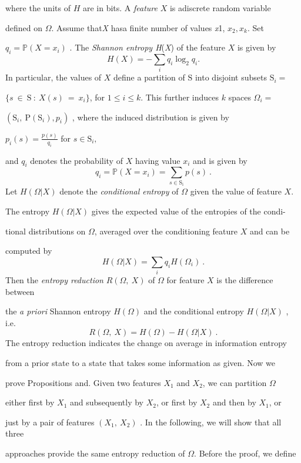 \documentclass[a4paper,12pt]{article}
\begin{document}
where the units of $H$ are in bits. A {\it feature} $X$ is adiscrete random variable

defined on $\Omega$. Assume that{\it X} hasa finite number of values {\it x}1, $x_{2}, x_{k}$. Set

$q_{i}=\mathbb{P}(X=x_{i})$ . The {\it Shannon entropy H}({\it X}) of the feature $X$ is given by
$$
H(X)=-\sum_{i}q_{i}\log_{2}q_{i}.
$$
In particular, the values of $X$ define a partition of $\mathrm{S}$ into disjoint subsets $\mathrm{S}_{i} =$

$\{s\ \in\ \mathrm{S}\ :\ X(s)\ =\ x_{i}\}$, for $1 \leq i \leq k$. This further induces $k$ spaces $\Omega_{i} =$

$(\mathrm{S}_{i},\ \mathrm{P}(\mathrm{S}_{i}),p_{i})$ , where the induced distribution is given by

$p_{i}(s)=\displaystyle \frac{p(s)}{q_{i}}$ for $s\in \mathrm{S}_{i},$

and $q_{i}$ denotes the probability of $X$ having value $x_{i}$ and is given by
$$
q_{i}=\mathbb{P}(X=x_{i})=\sum_{s\in \mathrm{S}_{\mathrm{i}}}p(s)\ .
$$
Let $H(\Omega|X)$ denote the {\it conditional entropy} of $\Omega$ given the value of feature $X.$

The entropy $H(\Omega|X)$ gives the expected value of the entropies of the condi-

tional distributions on $\Omega$, averaged over the conditioning feature $X$ and can be

computed by
$$
H(\Omega|X)=\sum_{i}q_{i}H(\Omega_{i})\ .
$$
Then the {\it entropy reduction} $R(\Omega,\ X)$ of $\Omega$ for feature $X$ is the difference between

the {\it a priori} Shannon entropy $H(\Omega)$ and the conditional entropy $H(\Omega|X)$ , i.e.
$$
R(\Omega,\ X)=H(\Omega)-H(\Omega|X)\ .
$$
The entropy reduction indicates the change on average in information entropy

from a prior state to a state that takes some information as given. Now we

prove Propositions and. Given two features $X_{1}$ and $X_{2}$, we can partition $\Omega$

either first by $X_{1}$ and subsequently by $X_{2}$, or first by $X_{2}$ and then by $X_{1}$, or

just by a pair of features $(X_{1},\ X_{2})$ . In the following, we will show that all three

approaches provide the same entropy reduction of $\Omega$. Before the proof, we define
\end{document}
